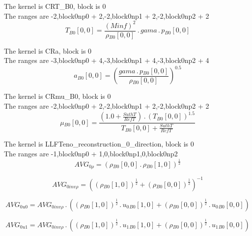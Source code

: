 \documentclass{article}
\begin{document}
\noindent The kernel is CRT_B0, block is 0\\\noindent The ranges are -2,block0np0 + 2,-2,block0np1 + 2,-2,block0np2 + 2\\\begin{dmath}{T{_{B0}}}[{0,0}] = \frac{\left(Minf \right)^{2}}{{\rho{_{B0}}}[{0,0}]} \,.\, gama \,.\, {p{_{B0}}}[{0,0}]\end{dmath}

\noindent The kernel is CRa, block is 0\\\noindent The ranges are -3,block0np0 + 4,-3,block0np1 + 4,-3,block0np2 + 4\\\begin{dmath}{a{_{B0}}}[{0,0}] = \left(\frac{gama \,.\, {p{_{B0}}}[{0,0}]}{{\rho{_{B0}}}[{0,0}]} \right)^{0.5}\end{dmath}

\noindent The kernel is CRmu_B0, block is 0\\\noindent The ranges are -2,block0np0 + 2,-2,block0np1 + 2,-2,block0np2 + 2\\\begin{dmath}{\mu{_{B0}}}[{0,0}] = \frac{\left(1.0 + \frac{SuthT}{RefT}\right) \,.\, \left({T{_{B0}}}[{0,0}] \right)^{1.5}}{{T{_{B0}}}[{0,0}] + \frac{SuthT}{RefT}}\end{dmath}

\noindent The kernel is LLFTeno_reconstruction_0_direction, block is 0\\\noindent The ranges are -1,block0np0 + 1,0,block0np1,0,block0np2\\\begin{dmath}AVG_{0 \rho} = \left({\rho{_{B0}}}[{0,0}] \,.\, {\rho{_{B0}}}[{1,0}] \right)^{\frac{1}{2}}\end{dmath}

\begin{dmath}AVG_{0 inv \rho} = \left(\left({\rho{_{B0}}}[{1,0}] \right)^{\frac{1}{2}} + \left({\rho{_{B0}}}[{0,0}] \right)^{\frac{1}{2}} \right)^{-1}\end{dmath}

\begin{dmath}AVG_{0 u0} = AVG_{0 inv \rho} \,.\, \left(\left({\rho{_{B0}}}[{1,0}] \right)^{\frac{1}{2}} \,.\, {u_{0}{_{B0}}}[{1,0}] + \left({\rho{_{B0}}}[{0,0}] \right)^{\frac{1}{2}} \,.\, {u_{0}{_{B0}}}[{0,0}]\right)\end{dmath}

\begin{dmath}AVG_{0 u1} = AVG_{0 inv \rho} \,.\, \left(\left({\rho{_{B0}}}[{1,0}] \right)^{\frac{1}{2}} \,.\, {u_{1}{_{B0}}}[{1,0}] + \left({\rho{_{B0}}}[{0,0}] \right)^{\frac{1}{2}} \,.\, {u_{1}{_{B0}}}[{0,0}]\right)\end{dmath}
\end{document}
